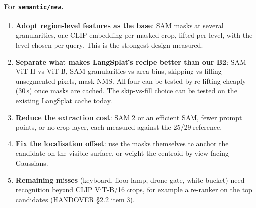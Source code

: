 \documentclass[11pt,a4paper]{article}
\newcommand{\code}[1]{\texttt{\small #1}}
\begin{document}
\paragraph{For \code{semantic/new}.}
\begin{enumerate}[leftmargin=*,itemsep=2pt]
  \item \textbf{Adopt region-level features as the base}: SAM masks at several granularities, one CLIP embedding per
        masked crop, lifted per level, with the level chosen per query. This is the strongest design measured.
  \item \textbf{Separate what makes LangSplat's recipe better than our B2}: SAM ViT-H vs ViT-B, SAM granularities vs
        area bins, skipping vs filling unsegmented pixels, mask NMS. All four can be tested by re-lifting cheaply (30\,s)
        once masks are cached. The skip-vs-fill choice can be tested on the existing LangSplat cache today.
  \item \textbf{Reduce the extraction cost}: SAM 2 or an efficient SAM, fewer prompt points, or no crop layer, each
        measured against the 25/29 reference.
  \item \textbf{Fix the localisation offset}: use the masks themselves to anchor the candidate on the visible surface, or
        weight the centroid by view-facing Gaussians.
  \item \textbf{Remaining misses} (keyboard, floor lamp, drone gate, white bucket) need recognition beyond CLIP ViT-B/16
        crops, for example a re-ranker on the top candidates (HANDOVER \S2.2 item 3).
\end{enumerate}
\end{document}
